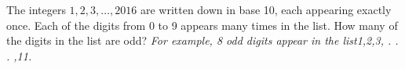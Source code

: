 The integers $1, 2, 3, \dots, 2016$ are written down in base 10, each appearing exactly once. Each of the digits from 0 to 9 appears many times in the list. How many of the digits in the list are odd? \textit{For example, 8 odd digits appear in the list1,2,3, . . . ,11.}